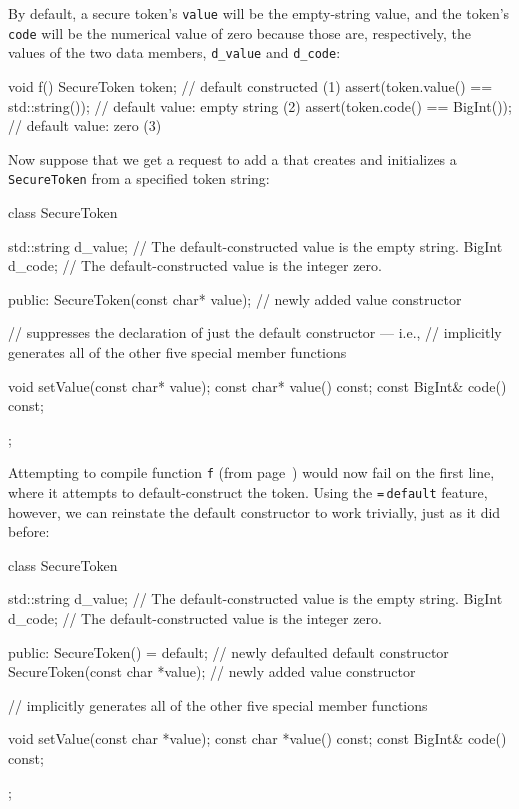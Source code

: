 \noindent By default, a secure token's \lstinline!value! will be the empty-string
value, and the token's \lstinline!code! will be the numerical value of zero
because those are, respectively, the  values
of the two data members, \lstinline!d_value! and \lstinline!d_code!:

\begin{emcppslisting}[emcppsbatch=e1,label=default-voidf-code]
void f()
{
    SecureToken token;                       // default constructed         (1)
    assert(token.value() == std::string());  // default value: empty string (2)
    assert(token.code() == BigInt());        // default value: zero         (3)
}
\end{emcppslisting}

\noindent Now suppose that we get a request to add a 
that creates and initializes a \lstinline!SecureToken! from a specified
token string:

\begin{emcppslisting}[emcppsbatch=e2]
class SecureToken
{
    std::string d_value;  // The default-constructed value is the empty string.
    BigInt      d_code;   // The default-constructed value is the integer zero.

public:
    SecureToken(const char* value);  // newly added value constructor

    // suppresses the declaration of just the default constructor --- i.e.,
    // implicitly generates all of the other five special member functions

    void setValue(const char* value);
    const char* value() const;
    const BigInt& code() const;
};
\end{emcppslisting}

\noindent Attempting to compile function \lstinline!f! (from page~\pageref{default-voidf-code}) would now fail on the
first line, where it attempts to default-construct the token. Using
the \lstinline!=!\,\lstinline!default! feature, however, we can reinstate the
default constructor to work trivially, just as
it did before:

\begin{emcppslisting}[emcppsbatch=e3]
class SecureToken
{
    std::string d_value;  // The default-constructed value is the empty string.
    BigInt d_code;        // The default-constructed value is the integer zero.

public:
    SecureToken() = default;         // newly defaulted default constructor
    SecureToken(const char *value);  // newly added value constructor

    // implicitly generates all of the other five special member functions

    void setValue(const char *value);
    const char *value() const;
    const BigInt& code() const;
};
\end{emcppslisting}


